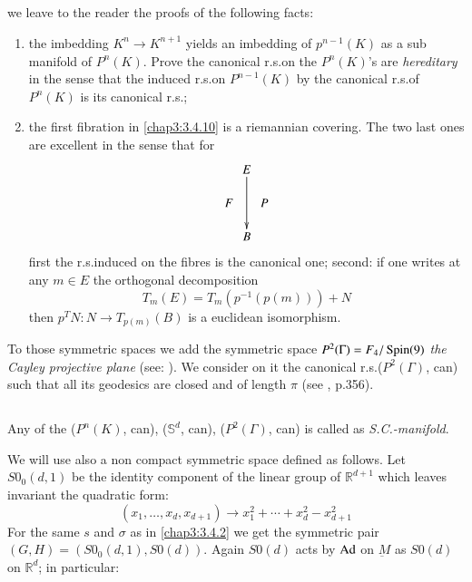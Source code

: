 \setcounter{subsection}{18}

\subsection{}\label{chap3:rems3.4.19}

\begin{remarks*}
we leave to the reader the proofs of the following facts:
\begin{enumerate}
\renewcommand{\theenumi}{\Alph{enumi}}
\renewcommand{\labelenumi}{\theenumi)}
\item the imbedding $K^{n}\to K^{n+1}$ yields an imbedding of
  $p^{n-1}(K)$ as a sub manifold of $P^{n}(K)$. Prove the canonical
  r.s.\@ on the $P^{n}(K)$'s are {\em hereditary} in the sense that
  the induced r.s.\@ on $P^{n-1}(K)$ by the canonical r.s.\@ of
  $P^{n}(K)$ is its canonical r.s.;

\item the first fibration in \eqref{chap3:3.4.10} is a riemannian
  covering. The two last ones are excellent in the sense that for 
\[
\xymatrix@C=.05cm@R=.5cm{
 & E\ar[dd] &\\
F & & P\\
 & B &
}
\]\pageoriginale
first the r.s.\@ induced on the fibres is the canonical one; second:
if one writes at any $m\in E$ the orthogonal decomposition
$$
T_{m}(E)=T_{m}(p^{-1}(p(m)))+N
$$
then $p^{T}N:N\to T_{p(m)}(B)$ is a euclidean isomorphism.
\end{enumerate}
\end{remarks*}

To those symmetric spaces we add the symmetric space
$P^{2}(\Gamma)=F_{4}/\operatorname{Spin}(9)$ {\em the Cayley projective plane} (see:
\cite{37}). We consider on it the canonical r.s.\@ ($P^{2}(\Gamma)$,
can) such that all its geodesics are closed and of length $\pi$ (see
\cite{14}, p.356). 

\setcounter{subsection}{19}

\subsection{}\label{chap3:3.4.20}

\begin{defi*}
Any of the ($P^{n}(K)$, can), ($\mathbb{S}^{d}$, can),
($P^{2}(\Gamma)$, can) is called as {\em S.C.-manifold}.
\end{defi*}

We will use also a non compact symmetric space defined as follows. Let
$S0_{0}(d,1)$ be the identity component of the linear group of
$\mathbb{R}^{d+1}$ which leaves invariant the quadratic form:
$$
(x_{1},\ldots,x_{d},x_{d+1})\to x^{2}_{1}+\cdots+x^{2}_{d}-x^{2}_{d+1}
$$
For the same $s$ and $\sigma$ as in \eqref{chap3:3.4.2} we get the symmetric
pair $(G,H)=(S0_{0}(d,1),S0(d))$. Again $S0(d)$ acts by $\operatorname{Ad}$ on
$\underbar{M}$ as $S0(d)$ on $\mathbb{R}^{d}$; in particular:

